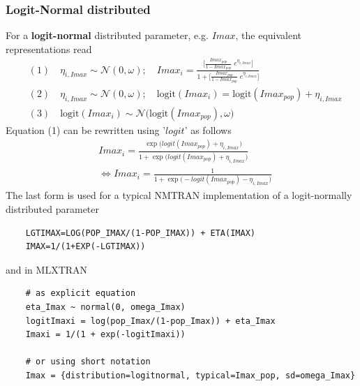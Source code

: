 
\subsubsection{Logit-Normal distributed}
For a \textbf{logit-normal} distributed parameter, e.g. $Imax$, the equivalent representations read
\begin{align*}
&(1) \quad \eta_{i,Imax} \sim \mathcal{N}(0,\omega); \quad  Imax_i= \frac{\bigg[\frac{ Imax_{pop}}{1- Imax_{pop}} \; e^{\eta_{i, Imax}} \bigg]}{ 1+  \bigg[\frac{ Imax_{pop}}{1- Imax_{pop}} \; e^{\eta_{i, Imax}} \bigg]}   \\
&(2) \quad  \eta_{i,Imax} \sim \mathcal{N}(0,\omega); \quad \mbox{logit}(  Imax_i ) = \mbox{logit}(  Imax_{pop} ) + \eta_{i, Imax}  \\
&(3) \quad  \mbox{logit}(  Imax_i ) \sim \mathcal{N}\big( \mbox{logit}( Imax_{pop} ),\omega\big)
\end{align*}
Equation (1) can be rewritten using '$logit$' as follows
\begin{align*}
& Imax_i= \frac{\exp\big(logit(Imax_{pop})  + \eta_{i,Imax} \big)}{ 1+ \exp\big(logit(Imax_{pop}) + \eta_{i,Imax} \big)}  \\
& \Leftrightarrow  Imax_i= \frac{1}{ 1+ \exp\big(- logit(Imax_{pop}) - \eta_{i,Imax} \big)}
\end{align*}\newline
The last form is used for a typical NMTRAN implementation of a logit-normally distributed parameter
\begin{lstlisting}
	LGTIMAX=LOG(POP_IMAX/(1-POP_IMAX)) + ETA(IMAX)
	IMAX=1/(1+EXP(-LGTIMAX))
\end{lstlisting}
and in MLXTRAN
\begin{lstlisting}
	# as explicit equation
	eta_Imax ~ normal(0, omega_Imax)
	logitImaxi = log(pop_Imax/(1-pop_Imax)) + eta_Imax
	Imaxi = 1/(1 + exp(-logitImaxi))

	# or using short notation
	Imax = {distribution=logitnormal, typical=Imax_pop, sd=omega_Imax}
\end{lstlisting}



